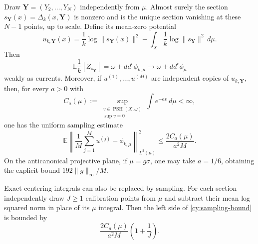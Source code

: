 \begin{corollary}
\label{cy:interpolation-sampling}
Draw $\mathbf Y=(Y_2,\ldots,Y_N)$ independently from $\mu$.
Almost surely the section
$s_{\mathbf Y}(x)=\Delta_k(x,\mathbf Y)$ is nonzero and is the unique
section vanishing at these $N-1$ points, up to scale. Define its
mean-zero potential
\[
 u_{k,\mathbf Y}(x)=\frac1k\log\|s_{\mathbf Y}(x)\|^2
                 -\int_X\frac1k\log\|s_{\mathbf Y}\|^2\,d\mu.
\]
Then
\begin{equation}
 \mathbb E\frac1k[Z_{s_{\mathbf Y}}]
       =\omega+dd^c\phi_{k,\mu}
       \longrightarrow\omega+dd^c\phi_\mu
 \label{cy:divisor-limit}
\end{equation}
weakly as currents. Moreover, if $u^{(1)},\ldots,u^{(M)}$ are independent
copies of $u_{k,\mathbf Y}$, then, for every $a>0$ with
\[
 C_a(\mu):=\sup_{\substack{v\in\operatorname{PSH}(X,\omega)\\\sup v=0}}
                      \int e^{-av}\,d\mu<\infty,
\]
one has the uniform sampling estimate
\begin{equation}
 \mathbb E\left\|\frac1M\sum_{j=1}^M u^{(j)}-\phi_{k,\mu}
             \right\|_{L^2(\mu)}^2
       \le\frac{2C_a(\mu)}{a^2M}.
 \label{cy:sampling-bound}
\end{equation}
On the anticanonical projective plane, if $\mu=g\sigma$, one may take
$a=1/6$, obtaining the explicit bound $192\|g\|_\infty/M$.

Exact centering integrals can also be replaced by sampling. For each
section independently draw $J\ge1$ calibration points from $\mu$
and subtract their mean log squared norm in place of its $\mu$ integral.
Then the left side of \eqref{cy:sampling-bound} is bounded by
\begin{equation}
 \frac{2C_a(\mu)}{a^2M}\left(1+\frac1J\right).
 \label{cy:sample-centered-bound}
\end{equation}
\end{corollary}

